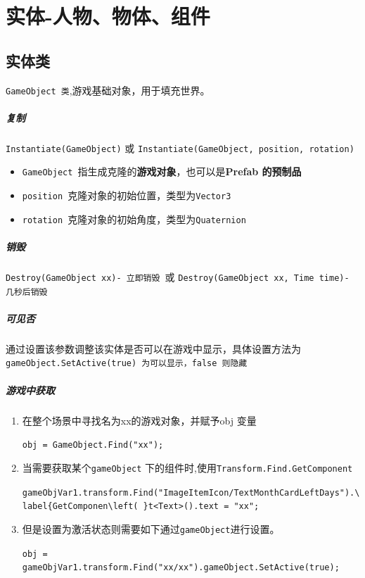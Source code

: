 \documentclass[UTF8,a4paper,12pt]{ctexbook}
\begin{document}
\chapter{实体-人物、物体、组件}
		
	\section{实体类} \verb|GameObject 类|,游戏基础对象，用于填充世界。
		\paragraph{复制}
			\verb|Instantiate(GameObject)| 或 \verb|Instantiate(GameObject, position, rotation)|
			
			\begin{itemize}
				\item \verb|GameObject |指生成克隆的\textbf{游戏对象}，也可以是\textbf{Prefab 的预制品}
				\item \verb|position |克隆对象的初始位置，类型为\verb|Vector3|
				\item \verb|rotation |克隆对象的初始角度，类型为\verb|Quaternion|
			\end{itemize} 
		
		\paragraph{销毁}
			\verb|Destroy(GameObject xx)- 立即销毁 |或 \verb|Destroy(GameObject xx, Time time)- 几秒后销毁|
			
		\paragraph{可见否}
			通过设置该参数调整该实体是否可以在游戏中显示，具体设置方法为\verb|gameObject.SetActive(true) 为可以显示，false 则隐藏|
		
		\paragraph{游戏中获取}
			\begin{enumerate}
				\item 在整个场景中寻找名为xx的游戏对象，并赋予obj 变量
					
					\verb|obj = GameObject.Find("xx");|
					
				\item 当需要获取某个\verb|gameObject| 下的组件时,使用\verb|Transform.Find.GetComponent|
					
					\verb|gameObjVar1.transform.Find("ImageItemIcon/TextMonthCardLeftDays").\label{GetComponen\left( }t<Text>().text = "xx";|
				
				\item 但是设置为激活状态则需要如下通过\verb|gameObject|进行设置。
				
					\verb|obj = gameObjVar1.transform.Find("xx/xx").gameObject.SetActive(true);|
			\end{enumerate}
\end{document}
